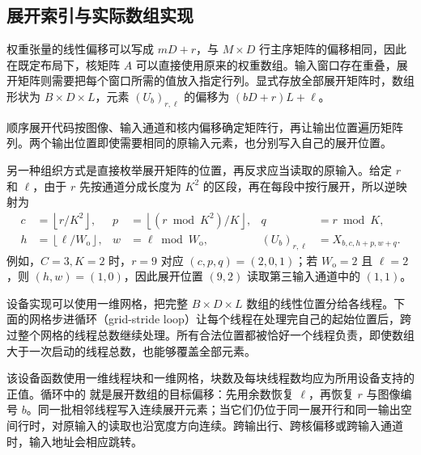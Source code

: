 \subsection{展开索引与实际数组实现}
\label{l11:subsec:unroll_code}

权重张量的线性偏移可以写成 $mD+r$，与 $M\times D$ 行主序矩阵的偏移相同，因此在既定布局下，核矩阵 $A$ 可以直接使用原来的权重数组。输入窗口存在重叠，展开矩阵则需要把每个窗口所需的值放入指定行列。显式存放全部展开矩阵时，数组形状为 $B\times D\times L$，元素 $(U_b)_{r,\ell}$ 的偏移为 $(bD+r)L+\ell$。

顺序展开代码按图像、输入通道和核内偏移确定矩阵行，再让输出位置遍历矩阵列。两个输出位置即使需要相同的原输入元素，也分别写入自己的展开位置。

\noindent\begin{minipage}{\linewidth}

\end{minipage}

另一种组织方式是直接枚举展开矩阵的位置，再反求应当读取的原输入。给定 $r$ 和 $\ell$，由于 $r$ 先按通道分成长度为 $K^2$ 的区段，再在每段中按行展开，所以逆映射为
\begin{equation}
\begin{aligned}
  c&=\left\lfloor r/K^2\right\rfloor,&
  p&=\left\lfloor (r\bmod K^2)/K\right\rfloor,&
  q&=r\bmod K,\\
  h&=\left\lfloor \ell/W_{\mathrm{o}}\right\rfloor,&
  w&=\ell\bmod W_{\mathrm{o}},&
  (U_b)_{r,\ell}&=X_{b,c,h+p,w+q}.
\end{aligned}
\label{l11:eq:unroll_inverse}
\end{equation}
例如，$C=3,K=2$ 时，$r=9$ 对应 $(c,p,q)=(2,0,1)$；若 $W_{\mathrm{o}}=2$ 且 $\ell=2$，则 $(h,w)=(1,0)$，因此展开位置 $(9,2)$ 读取第三输入通道中的 $(1,1)$。

设备实现可以使用一维网格，把完整 $B\times D\times L$ 数组的线性位置分给各线程。下面的网格步进循环（grid-stride loop）让每个线程在处理完自己的起始位置后，跨过整个网格的线程总数继续处理。所有合法位置都被恰好一个线程负责，即使数组大于一次启动的线程总数，也能够覆盖全部元素。

\noindent\begin{minipage}{\linewidth}

\end{minipage}

该设备函数使用一维线程块和一维网格，块数及每块线程数均应为所用设备支持的正值。循环中的  就是展开数组的目标偏移：先用余数恢复 $\ell$，再恢复 $r$ 与图像编号 $b$。同一批相邻线程写入连续展开元素；当它们仍位于同一展开行和同一输出空间行时，对原输入的读取也沿宽度方向连续。跨输出行、跨核偏移或跨输入通道时，输入地址会相应跳转。

